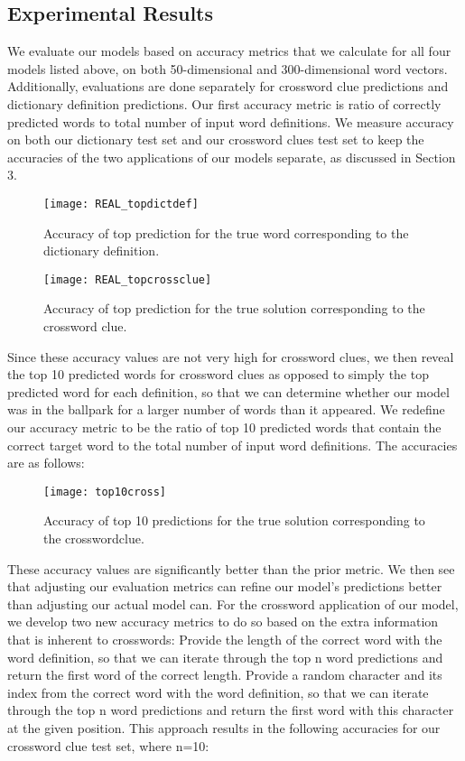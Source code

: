 \documentclass{article} %
\begin{document}
\subsection{Experimental Results}
We evaluate our models based on accuracy metrics that we calculate for all four models listed above, on both 50-dimensional and 300-dimensional word vectors. Additionally, evaluations are done separately for crossword clue predictions and dictionary definition predictions.
Our first accuracy metric is ratio of correctly predicted words to total number of input word definitions. We measure accuracy on both our dictionary test set and our crossword clues test set to keep the accuracies of the two applications of our models separate, as discussed in Section 3.

\begin{figure}
	\texttt{[image: REAL\_topdictdef]}
	\label{Fig 1}
	\caption{Accuracy of top prediction for the true word corresponding to the dictionary definition.}
\end{figure}

\begin{figure}
	\texttt{[image: REAL\_topcrossclue]}
	\label{Fig 2}
	\caption{Accuracy of top prediction for the true solution corresponding to the crossword clue.}
\end{figure}

Since these accuracy values are not very high for crossword clues, we then reveal the top 10 predicted words for crossword clues as opposed to simply the top predicted word for each definition, so that we can determine whether our model was in the ballpark for a larger number of words than it appeared. We redefine our accuracy metric to be the ratio of top 10 predicted words that contain the correct target word to the total number of input word definitions. The accuracies are as follows:

\begin{figure}
	\texttt{[image: top10cross]}
	\label{Fig 3}
	\caption{Accuracy of top 10 predictions for the true solution corresponding to the crosswordclue.}
\end{figure}

These accuracy values are significantly better than the prior metric. We then see that adjusting our evaluation metrics can refine our model’s predictions better than adjusting our actual model can. For the crossword application of our model, we develop two new accuracy metrics to do so based on the extra information that is inherent to crosswords:
Provide the length of the correct word with the word definition, so that we can iterate through the top n word predictions and return the first word of the correct length.
Provide a random character and its index from the correct word with the word definition, so that we can iterate through the top n word predictions and return the first word with this character at the given position. 
This approach results in the following accuracies for our crossword clue test set, where n=10:
\end{document}
